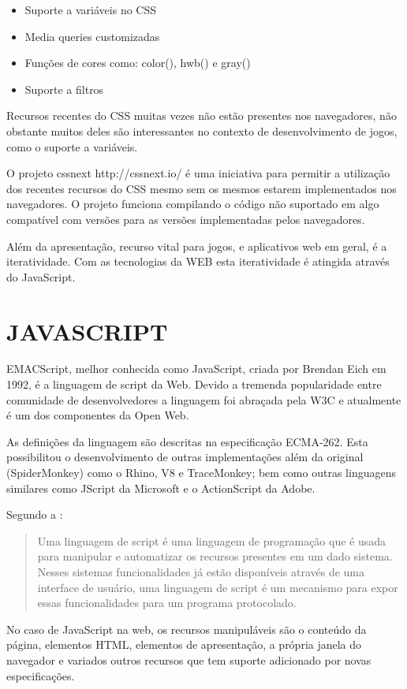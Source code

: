 \begin{itemize}
\item Suporte a variáveis no CSS
\item Media queries customizadas
\item Funções de cores como: color(), hwb() e gray()
\item Suporte a filtros
\end{itemize}

Recursos recentes do CSS muitas vezes não estão presentes nos
navegadores, não obstante muitos deles são interessantes no contexto
de desenvolvimento de jogos, como o suporte a variáveis.

O projeto cssnext http://cssnext.io/ é uma iniciativa para permitir a
utilização dos recentes recursos do CSS mesmo sem os mesmos estarem
implementados nos navegadores. O projeto funciona compilando o código
não suportado em algo compatível com versões para as versões
implementadas pelos navegadores.

Além da apresentação, recurso vital para jogos, e aplicativos web em
geral, é a iteratividade. Com as tecnologias da WEB esta iteratividade
é atingida através do JavaScript.
\section{JAVASCRIPT}

EMACScript, melhor conhecida como JavaScript, criada por Brendan Eich em
1992, é a linguagem de script da Web. Devido a tremenda popularidade
entre comunidade de desenvolvedores a linguagem foi abraçada pela W3C e
atualmente é um dos componentes da Open Web.

As definições da linguagem são descritas na especificação ECMA-262.
Esta possibilitou o desenvolvimento de outras implementações além da
original (SpiderMonkey) como o Rhino, V8 e TraceMonkey; bem como
outras linguagens similares como JScript da Microsoft e o ActionScript
da Adobe.

Segundo a \cite{ecmaSpecificaton}:
\begin{quote}
Uma linguagem de script é uma linguagem de programação que é
usada para manipular e automatizar os recursos presentes em um dado
sistema. Nesses sistemas funcionalidades já estão disponíveis
através de uma interface de usuário, uma linguagem de script é
um mecanismo para expor essas funcionalidades para um programa
protocolado.
\end{quote}

No caso de JavaScript na web, os recursos manipuláveis são o conteúdo
da página, elementos HTML, elementos de apresentação,
a própria janela do navegador e variados outros recursos que tem
suporte adicionado por novas especificações.

